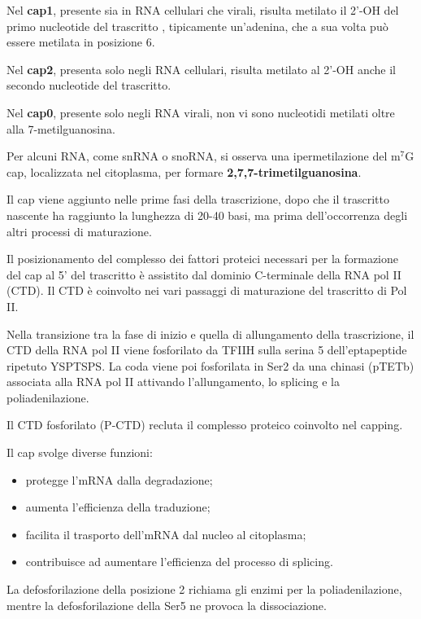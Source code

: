 \documentclass[11pt]{book}
\begin{document}
Nel \textbf{cap1}, presente sia in RNA cellulari che virali, risulta
metilato il 2'-OH del primo nucleotide del trascritto , tipicamente
un'adenina, che a sua volta può essere metilata in posizione 6.

Nel \textbf{cap2}, presenta solo negli RNA cellulari, risulta metilato
al 2'-OH anche il secondo nucleotide del trascritto.

Nel \textbf{cap0}, presente solo negli RNA virali, non vi sono
nucleotidi metilati oltre alla 7-metilguanosina.

Per alcuni RNA, come snRNA o snoRNA, si osserva una ipermetilazione del
m\(^7\)G cap, localizzata nel citoplasma, per formare
\textbf{2,7,7-trimetilguanosina}.

Il cap viene aggiunto nelle prime fasi della trascrizione, dopo che il
trascritto nascente ha raggiunto la lunghezza di 20-40 basi, ma prima
dell'occorrenza degli altri processi di maturazione.

Il posizionamento del complesso dei fattori proteici necessari per la
formazione del cap al 5' del trascritto è assistito dal dominio
C-terminale della RNA pol II (CTD). Il CTD è coinvolto nei vari passaggi
di maturazione del trascritto di Pol II.

Nella transizione tra la fase di inizio e quella di allungamento della
trascrizione, il CTD della RNA pol II viene fosforilato da TFIIH sulla
serina 5 dell'eptapeptide ripetuto YSPTSPS. La coda viene poi
fosforilata in Ser2 da una chinasi (pTETb) associata alla RNA pol II
attivando l'allungamento, lo splicing e la poliadenilazione.

Il CTD fosforilato (P-CTD) recluta il complesso proteico coinvolto nel
capping.

Il cap svolge diverse funzioni:

\begin{itemize}
\itemsep1pt\parskip0pt
\item
  protegge l'mRNA dalla degradazione;
\item
  aumenta l'efficienza della traduzione;
\item
  facilita il trasporto dell'mRNA dal nucleo al citoplasma;
\item
  contribuisce ad aumentare l'efficienza del processo di splicing.
\end{itemize}

La defosforilazione della posizione 2 richiama gli enzimi per la
poliadenilazione, mentre la defosforilazione della Ser5 ne provoca la
dissociazione.
\end{document}
